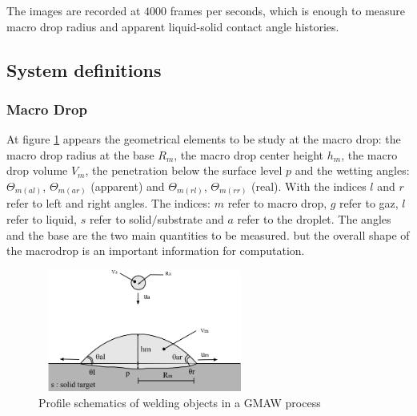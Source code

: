\documentclass[12pt]{iopart}
\begin{document}
The images are recorded at $4000$ frames per seconds, which is enough to
measure macro drop radius and apparent liquid-solid contact angle histories. 

      
      
      
      
\subsection{ System definitions}
\label{system_definitions}
\subsubsection{ Macro Drop}
\label{ macro_drop}


At figure \ref{schema-macro-drop-droplet-parameters} appears the geometrical 
elements to be study at the macro drop: the macro drop radius at the base $R_{m}$, 
the macro drop center height $h_{m}$, the macro drop volume $V_{m}$, the
penetration below the surface level $p$ and the wetting angles:
$\Theta_{m(al)}$, $\Theta_{m(ar)}$ (apparent) and $\Theta_{m(rl)}$, $\Theta_{m(rr)}$ (real).
With the indices $l$ and $r$ refer to left and
right angles. The indices: $m$ refer to macro drop, $g$ refer to gaz, $l$ refer
to liquid, $s$ refer to solid$/$substrate and $a$ refer to the droplet.
The angles and the base are the two main quantities to be measured. but the overall shape of
the macrodrop is an important information for computation.

\begin{figure}
\begin{center}
\includegraphics[width=7cm,height=4cm]{images/schema-macro-drop-droplet-parameters.png}
\caption{{\small Profile schematics of welding objects in a GMAW process}}
\label{schema-macro-drop-droplet-parameters}
\end{center}
\end{figure}
    
\end{document}
